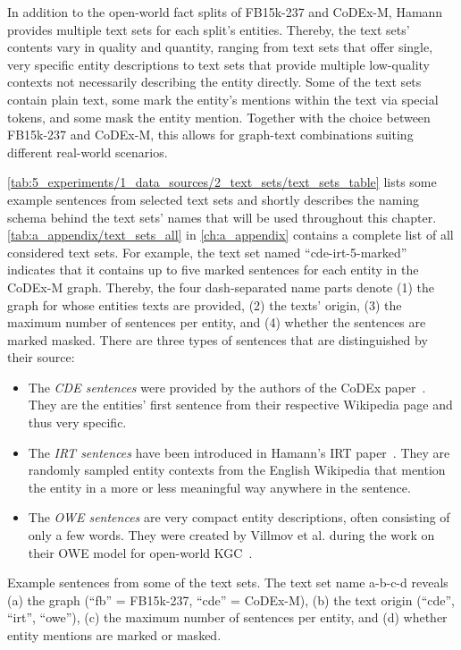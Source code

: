 In addition to the open-world fact splits of FB15k-237 and CoDEx-M, Hamann provides multiple text sets for each split's entities. Thereby, the text sets' contents vary in quality and quantity, ranging from text sets that offer single, very specific entity descriptions to text sets that provide multiple low-quality contexts not necessarily describing the entity directly. Some of the text sets contain plain text, some mark the entity's mentions within the text via special tokens, and some mask the entity mention. Together with the choice between FB15k-237 and CoDEx-M, this allows for graph-text combinations suiting different real-world scenarios.

\autoref{tab:5_experiments/1_data_sources/2_text_sets/text_sets_table} lists some example sentences from selected text sets and shortly describes the naming schema behind the text sets' names that will be used throughout this chapter. \autoref{tab:a_appendix/text_sets_all} in \autoref{ch:a_appendix} contains a complete list of all considered text sets. For example, the text set named ``cde-irt-5-marked'' indicates that it contains up to five marked sentences for each entity in the CoDEx-M graph. Thereby, the four dash-separated name parts denote (1) the graph for whose entities texts are provided, (2) the texts' origin, (3) the maximum number of sentences per entity, and (4) whether the sentences are marked masked. There are three types of sentences that are distinguished by their source:

\begin{itemize}
    \item The \emph{CDE sentences} were provided by the authors of the CoDEx paper~\cite{}. They are the entities' first sentence from their respective Wikipedia page and thus very specific.

    \item The \emph{IRT sentences} have been introduced in Hamann's IRT paper~\cite{}. They are randomly sampled entity contexts from the English Wikipedia that mention the entity in a more or less meaningful way anywhere in the sentence.

    \item The \emph{OWE sentences} are very compact entity descriptions, often consisting of only a few words. They were created by Villmov et al. during the work on their OWE model for open-world KGC~\cite{Shah2019AnOE}.
\end{itemize}

\begin{table}
    \centering
    
    \caption{Example sentences from some of the text sets. The text set name a-b-c-d reveals (a) the graph (``fb'' = FB15k-237, ``cde'' = CoDEx-M), (b) the text origin (``cde'', ``irt'', ``owe''), (c) the maximum number of sentences per entity, and (d) whether entity mentions are marked or masked.}
    \label{tab:5_experiments/1_data_sources/2_text_sets/text_sets_table}
\end{table}

